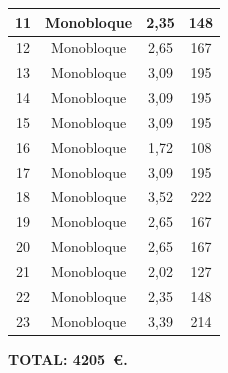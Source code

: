\begin{table}[H]
\begin{tabular}{|c|c|c|c|}
11                & Monobloque                   & 2,35                                                                       & 148                  \\ \hline
12                & Monobloque                   & 2,65                                                                       & 167                  \\ \hline
13                & Monobloque                   & 3,09                                                                       & 195                  \\ \hline
14                & Monobloque                   & 3,09                                                                       & 195                  \\ \hline
15                & Monobloque                   & 3,09                                                                       & 195                  \\ \hline
16                & Monobloque                   & 1,72                                                                       & 108                  \\ \hline
17                & Monobloque                   & 3,09                                                                       & 195                  \\ \hline
18                & Monobloque                   & 3,52                                                                       & 222                  \\ \hline
19                & Monobloque                   & 2,65                                                                       & 167                  \\ \hline
20                & Monobloque                   & 2,65                                                                       & 167                  \\ \hline
21                & Monobloque                   & 2,02                                                                       & 127                  \\ \hline
22                & Monobloque                   & 2,35                                                                       & 148                  \\ \hline
23                & Monobloque                   & 3,39                                                                       & 214                  \\ \hline
\end{tabular}
\end{table}
\textbf{TOTAL: \SI{4205}{€}.}
